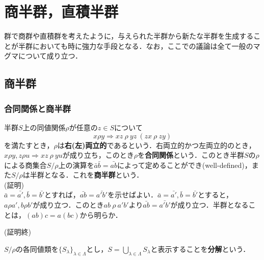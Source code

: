 \documentclass{jsarticle}
\begin{document}
\section{商半群，直積半群}
群で商群や直積群を考えたように，与えられた半群から新たな半群を生成することが半群においても時に強力な手段となる．なお，ここでの議論は全て一般のマグマについて成り立つ．
\subsection{商半群}
\subsubsection{合同関係と商半群}
半群$S$上の同値関係$\rho$が任意の$z\in S$について$$x\rho y\Rightarrow  xz\:\rho\: yz\:(zx\:\rho\: zy)$$を満たすとき，$\rho$は{\bf 右(左)両立的}であるという．右両立的かつ左両立的のとき，$x\rho y, z\rho u\Rightarrow xz\:\rho\:yu$が成り立ち，このとき$\rho$を{\bf 合同関係}という．このとき半群$S$の$\rho$による商集合$S/\rho$上の演算を$\bar{a}\bar{b}=\bar{ab}$によって定めることができ(well-defined)，また$S/\rho$は半群となる．これを{\bf 商半群}という．\\
(証明)\\
$\bar{a}=\bar{a'},\bar{b}=\bar{b'}$とすれば，$\bar{ab}=\bar{a'b'}$を示せばよい．$\bar{a}=\bar{a'},\bar{b}=\bar{b'}$とすると，$a\rho a',b\rho b'$が成り立つ．このとき$ab\:\rho\:a'b'$より$\bar{ab}=\bar{a'b'}$が成り立つ．半群となることは，$(ab)c=a(bc)$から明らか．
\begin{flushright}
(証明終)
\end{flushright}
$S/\rho$の各同値類を$\{S_\lambda\}_{\lambda\in\Lambda}$とし，$S=\displaystyle\bigcup_{\lambda\in\Lambda}S_{\lambda}$と表示することを{\bf 分解}という．
\end{document}
